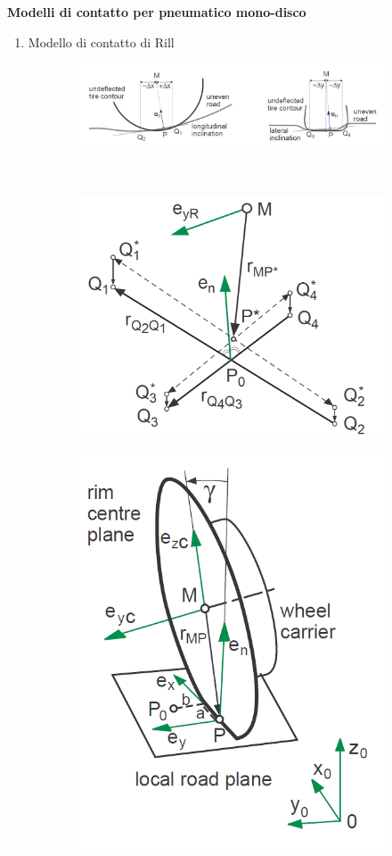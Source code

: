 \documentclass[xcolor=dvipsnames]{beamer} %
\begin{document}
\begin{frame}
	\Large{\textbf{Modelli di contatto per pneumatico mono-disco}}
	\normalsize
	\begin{enumerate}
		\item Modello di contatto di Rill
	\end{enumerate}
\begin{figure}
	\centering
	\begin{subfigure}{\linewidth}
		\centering
		\includegraphics[width=0.8\linewidth]{../Figures/local_plane_1}
	\end{subfigure}\\
	\hspace{1cm}
	\begin{subfigure}{0.45\linewidth}
		\centering
		\includegraphics[width=0.7\linewidth]{../Figures/local_track}
	\end{subfigure}
	\begin{subfigure}{0.45\linewidth}
		\centering
		\includegraphics[width=0.5\linewidth]{../Figures/contact_geometry_2}
	\end{subfigure}
\end{figure}
		
\end{frame}
\end{document}
